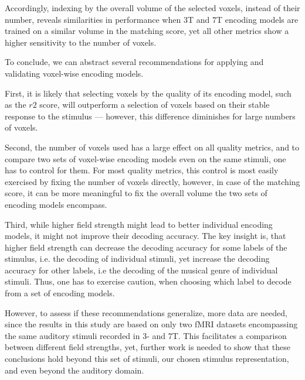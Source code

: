 Accordingly, indexing by the overall volume of the selected voxels,
instead of their number, reveals similarities in performance when 3T
and 7T encoding models are trained on a similar volume in the matching
score, yet all other metrics show a higher sensitivity to the number of
voxels.

To conclude, we can abstract several recommendations for applying and validating
voxel-wise encoding models.

First, it is likely that selecting voxels by the quality of its encoding model,
such as the $r2$ score, will outperform a selection of voxels based on their
stable response to the stimulus --- however, this difference diminishes for
large numbers of voxels.

Second, the number of voxels used has a large effect on all quality metrics, and
to compare two sets of voxel-wise encoding models even on the same stimuli, one
has to control for them.
For most quality metrics, this control is most easily exercised by fixing the
number of voxels directly, however, in case of the matching score, it can be
more meaningful to fix the overall volume the two sets of encoding models
encompass.

Third, while higher field strength might lead to better individual encoding
models, it might not improve their decoding accuracy.
The key insight is, that higher field strength can decrease the decoding
accuracy for some labels of the stimulus, i.e. the decoding of individual
stimuli, yet increase the decoding accuracy for other labels, i.e the decoding
of the musical genre of individual stimuli.
Thus, one has to exercise caution, when choosing which label to decode from a set
of encoding models.

However, to assess if these recommendations generalize, more data are
needed, since the results in this study are based on only two f{MRI} datasets
encompassing the same auditory stimuli recorded in 3- and 7T.
This facilitates a comparison between different field
strengths, yet, further work is needed to show that these conclusions hold beyond
this set of stimuli, our chosen stimulus representation, and even beyond the auditory domain.

